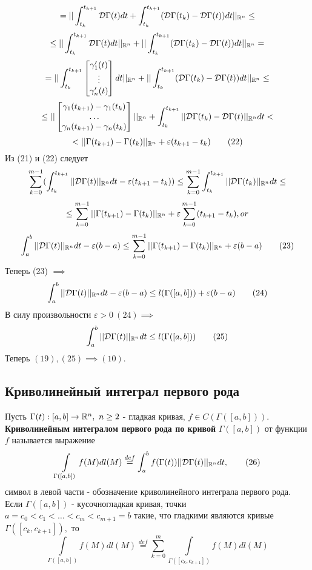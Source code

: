 \documentclass[main]{subfiles}
\begin{document}
\begin{longProof}
\[ =||\int_{t_k}^{t_{k+1}}\mathcal{D}\Gamma(t)dt+\int_{t_k}^{t_{k+1}}(\mathcal{D}\Gamma(t_k)-\mathcal{D}\Gamma(t))dt||_{\mathbb{R}^n}\leq \]
\[ \leq ||\int_{t_k}^{t_{k+1}}\mathcal{D}\Gamma(t)dt||_{\mathbb{R}^n}+||\int_{t_k}^{t_{k+1}}(\mathcal{D}\Gamma(t_k)-\mathcal{D}\Gamma(t))dt||_{\mathbb{R}^n}=\]
\[ =||\int_{t_k}^{t_{k+1}} \begin{bmatrix}\gamma'_1(t)\\\vdots\\\gamma'_n(t)\end{bmatrix}dt||_{\mathbb{R}^n}+||\int_{t_k}^{t_{k+1}}(\mathcal{D}\Gamma(t_k)-\mathcal{D}\Gamma(t))dt||_{\mathbb{R}^n}\leq\]
\[ \leq||\begin{bmatrix}\gamma_1(t_{k+1})-\gamma_1(t_k)\\\dots\\\gamma_n(t_{k+1})-\gamma_n(t_k)\end{bmatrix}||_{\mathbb{R}^n}+\int_{t_k}^{t_{k+1}}||\mathcal{D}\Gamma(t_k)-\mathcal{D}\Gamma(t)||_{\mathbb{R}^n} dt< \]
\[ <||\Gamma(t_{k+1})-\Gamma(t_k)||_{\vR^n}+\varepsilon(t_{k+1}-t_k)\tag{22} \]
Из (21) и (22) следует
\[\sum\limits_{k=0}^{m-1}(\int_{t_k}^{t_{k+1}}||\mathcal{D}\Gamma(t)||_{\mathbb{R}^n} dt-\varepsilon(t_{k+1}-t_k))\leq\sum\limits_{k=0}^{m-1}\int_{t_k}^{t_{k+1}}||\mathcal{D}\Gamma(t_k)||_{\mathbb{R}^n} dt\leq \]
\[ \leq \sum\limits_{k=0}^{m-1}||\Gamma(t_{k+1})-\Gamma(t_k)||_{\mathbb{R}^n}+\varepsilon\sum_{k=0}^{m-1}(t_{k+1}-t_k), or \]
\[ \int_a^b||\mathcal{D}\Gamma(t)||_{\mathbb{R}^n} dt-\varepsilon(b-a)\leq \sum\limits_{k=0}^{m-1}||\Gamma(t_{k+1})-\Gamma(t_k)||_{\mathbb{R}^n}+\varepsilon(b-a)\tag{23} \]
Теперь (23) $\implies$
\[ \int_a^b||\mathcal{D}\Gamma(t)||_{\mathbb{R}^n} dt-\varepsilon(b-a)\leq l(\Gamma([a,b]))+\varepsilon(b-a)\tag{24} \]
В силу произвольности $\varepsilon>0\ (24) \implies$
 \[ \int_a^b||\mathcal{D}\Gamma(t)||_{\mathbb{R}^n} dt\leq l(\Gamma([a,b]))\tag{25} \]
Теперь $(19), (25)\implies (10).$ 
 \end{longProof}

\subsection{Криволинейный интеграл первого рода}
\begin{definition}
     Пусть $\Gamma(t):[a,b]\rightarrow{\vR^n},\ n\geq 2$ - гладкая кривая, $f\in C(\Gamma([a,b])).$ \\
\textbf{Криволинейным интегралом первого рода по кривой} $\Gamma([a,b])$ от функции $f$ называется выражение
\[ \int\limits_{\Gamma([a,b])} f(M)dl(M)\overset{def}{=}\int_a^b f(\Gamma(t))||\mathcal{D}\Gamma(t)||_{\mathbb{R}^n} dt,\tag{26} \]
символ в левой части - обозначение криволинейного интеграла первого рода.\\
Если $\Gamma([a,b])$ - кусочногладкая кривая, точки $a=c_0<c_1<\dots<c_m<c_{m+1}=b$ такие, что гладкими являются кривые
 $\Gamma([c_k,c_{k+1}]),$ то \[ \int\limits_{\Gamma([a,b])} f(M)dl(M)\overset{def}{=}\sum\limits_{k=0}^m \int\limits_{\Gamma([c_k,c_{k+1}])} f(M)dl(M) \]
\end{definition}
\end{document}
